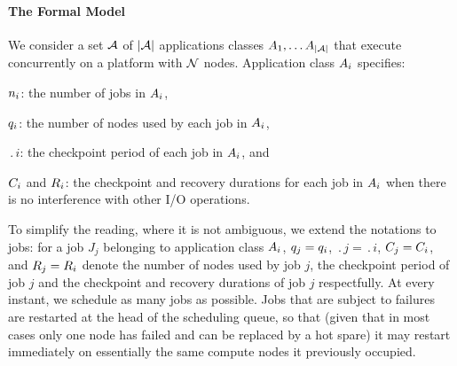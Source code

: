 \paragraph*{The Formal Model}
We consider a set ${\mathcal A}$ of $|{\mathcal A}|$ applications classes
$A_{1}, \ldots A_{|{\mathcal A}|}$ that execute concurrently on a platform with
${\mathcal N}$ nodes. Application class $A_{i}$ specifies:
\begin{compactitem}
\item $n_{i}$: the number of jobs in $A_{i}$,
\item $q_{i}$: the number of nodes used by each job in $A_{i}$,
\item $\period{i}$: the checkpoint period of each job in $A_{i}$, and
\item $C_{i}$ and $R_{i}$: the checkpoint and recovery durations for each job in $A_{i}$ when there is no interference with other I/O operations.
\end{compactitem}
To simplify the reading, where it is not ambiguous, we extend the
notations to jobs: for a job $J_j$ belonging to application class
$A_{i}$, $q_{j} = q_{i}$, $\period{j} = \period{i}$,
$C_{j} = C_{i}$, and $R_{j} = R_{i}$ denote the number of
nodes used by job $j$, the checkpoint period of job $j$ and the
checkpoint and recovery durations of job $j$ respectfully.  At every
instant, we schedule as many jobs as possible.  Jobs that are subject
to failures are restarted at the head of the scheduling queue, so that
(given that in most cases only one node has failed and can be replaced
by a hot spare) it may restart immediately on essentially the same
compute nodes it previously occupied.
